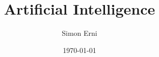\titlehead{Hochschule Luzern \\ 
	Technik \& Architektur}
\subject{Zusammenfassung}
\title{Artificial Intelligence}
\subtitle{}
\author{Simon Erni}
\date{\today}

\maketitle